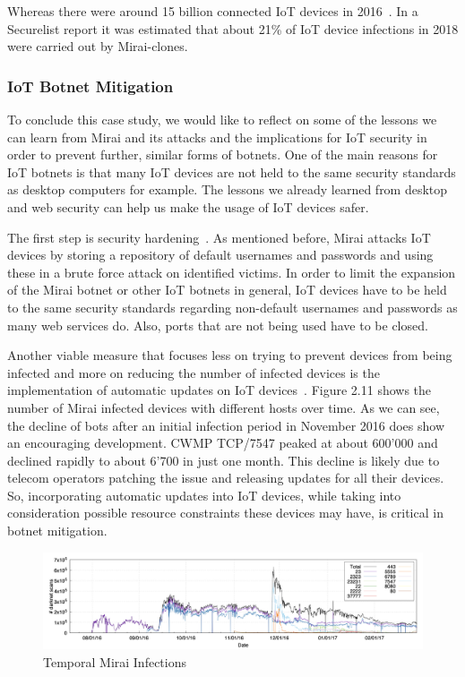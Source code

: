 Whereas there were around 15 billion connected IoT devices in 2016~\cite{Ericsson}.
In a Securelist report it was estimated that about 21\% of IoT device infections in 2018 were carried out by Mirai-clones.\cite{Eremin19}

\subsubsection{IoT Botnet Mitigation}
To conclude this case study, we would like to reflect on some of the lessons we can learn from Mirai and its attacks and the implications for IoT security in order to prevent further, similar forms of botnets.
One of the main reasons for IoT botnets is that many IoT devices are not held to the same security standards as desktop computers for example.
The lessons we already learned from desktop and web security can help us make the usage of IoT devices safer.

The first step is security hardening~\cite{Antonakakis17}.
As mentioned before, Mirai attacks IoT devices by storing a repository of default usernames and passwords and using these in a brute force attack on identified victims.
In order to limit the expansion of the Mirai botnet or other IoT botnets in general, IoT devices have to be held to the same security standards regarding non-default usernames and passwords as many web services do.
Also, ports that are not being used have to be closed.

Another viable measure that focuses less on trying to prevent devices from being infected and more on reducing the number of infected devices is the implementation of automatic updates on IoT devices~\cite{Antonakakis17}.
Figure 2.11 shows the number of Mirai infected devices with different hosts over time.
As we can see, the decline of bots after an initial infection period in November 2016 does show an encouraging development.
CWMP TCP/7547 peaked at about 600'000 and declined rapidly to about 6'700 in just one month.
This decline is likely due to telecom operators patching the issue and releasing updates for all their devices.
So, incorporating automatic updates into IoT devices, while taking into consideration possible resource constraints these devices may have, is critical in botnet mitigation.

\begin{figure}[ht]
\begin{center} \includegraphics[scale=0.5]{Talk11/MiraiInfections} \end{center}
\caption{Temporal Mirai Infections~\cite{Antonakakis17}}
\label{MiraiInfections}
\end{figure}


